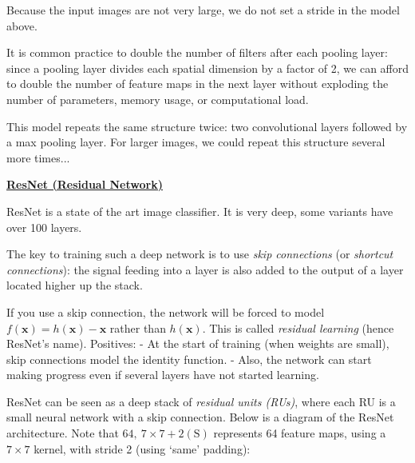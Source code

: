 Because the input images are not very large, we do not set a stride in the model above.

It is common practice to double the number of filters after each pooling layer:
since a pooling layer divides each spatial dimension by a factor of 2,
we can afford to double the number of feature maps in the next layer
without exploding the number of parameters, memory usage, or computational load.

This model repeats the same structure twice:
two convolutional layers followed by a max pooling layer.
For larger images, we could repeat this structure several more times...

\newpage
\textbf{\underline{ResNet (Residual Network)}}

ResNet is a state of the art image classifier.
It is very deep, some variants have over 100 layers.

The key to training such a deep network is to use \textit{skip connections} (or \textit{shortcut connections}):\newline
the signal feeding into a layer is also added to the output of a layer located higher up the stack.

If you use a skip connection,
the network will be forced to model $f(\boldsymbol{x}) = h(\boldsymbol{x}) - \boldsymbol{x}$
\newline rather than $h(\boldsymbol{x})$.
This is called \textit{residual learning} (hence ResNet's name). Positives:\newline
- At the start of training (when weights are small), skip connections model the identity function.\newline
- Also, the network can start making progress even if several layers have not started learning.

ResNet can be seen as a deep stack of \textit{residual units (RUs)},
where each RU is a small neural network with a skip connection.
Below is a diagram of the ResNet architecture.
Note that $64,~7\!\times\!7 + 2(\textrm{S})$ represents 64 feature maps,
using a $7\!\times\!7$ kernel, with stride 2 (using `same' padding):

